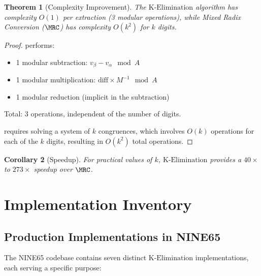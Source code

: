 \documentclass[11pt,letterpaper]{article}
\newtheorem{theorem}{Theorem}[section]
\newtheorem{corollary}[theorem]{Corollary}
\newcommand{\KElim}{\text{K-Elimination}}
\begin{document}
\begin{theorem}[Complexity Improvement]
\label{thm:complexity}
The \(\KElim\) algorithm has complexity \(O(1)\) per extraction (3 modular operations), while Mixed Radix Conversion (\(\MRC\)) has complexity \(O(k^2)\) for \(k\) digits.
\end{theorem}

\begin{proof}
\KElim\) performs:

\begin{itemize}
\item 1 modular subtraction: \(v_{\beta} - v_{\alpha} \mod A\)
\item 1 modular multiplication: \(\text{diff} \times M^{-1} \mod A\)
\item 1 modular reduction (implicit in the subtraction)
\end{itemize}

Total: 3 operations, independent of the number of digits.

\MRC\) requires solving a system of \(k\) congruences, which involves \(O(k)\) operations for each of the \(k\) digits, resulting in \(O(k^2)\) total operations.
\end{proof}

\begin{corollary}[Speedup]
\label{cor:speedup}
For practical values of \(k\), \(\KElim\) provides a \(40\times{}\) to \(273\times{}\) speedup over \(\MRC\).
\end{corollary}

\newpage

\section{Implementation Inventory}
\label{sec:implementations}

\subsection{Production Implementations in NINE65}

The NINE65 codebase contains seven distinct \(\KElim\) implementations, each serving a specific purpose:
\end{document}
